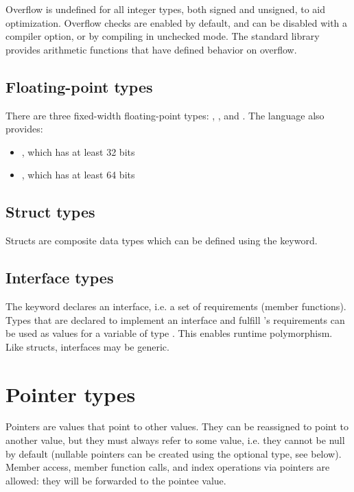 Overflow is undefined for all integer types, both signed and unsigned, to aid
optimization. Overflow checks are enabled by default, and can be disabled with a
compiler option, or by compiling in unchecked mode. The standard library
provides arithmetic functions that have defined behavior on overflow.

\subsection{Floating-point types}

There are three fixed-width floating-point types: ,
, and . The language also provides:

\begin{itemize}
\item {}, which has at least 32 bits
\item {}, which has at least 64 bits
\end{itemize}

\subsection{Struct types}

Structs are composite data types which can be defined using the 
keyword.

\subsection{Interface types}

The  keyword declares an interface, i.e. a set of requirements
(member functions). Types that are declared to implement an
interface  and fulfill 's requirements can be used as values for
a variable of type . This enables runtime polymorphism. Like structs,
interfaces may be generic.

\section{Pointer types}

Pointers are values that point to other values. They can be reassigned to point
to another value, but they must always refer to some value, i.e. they cannot be
null by default (nullable pointers can be created using the optional type, see
below). Member access, member function calls, and index operations via
pointers are allowed: they will be forwarded to the pointee value.

